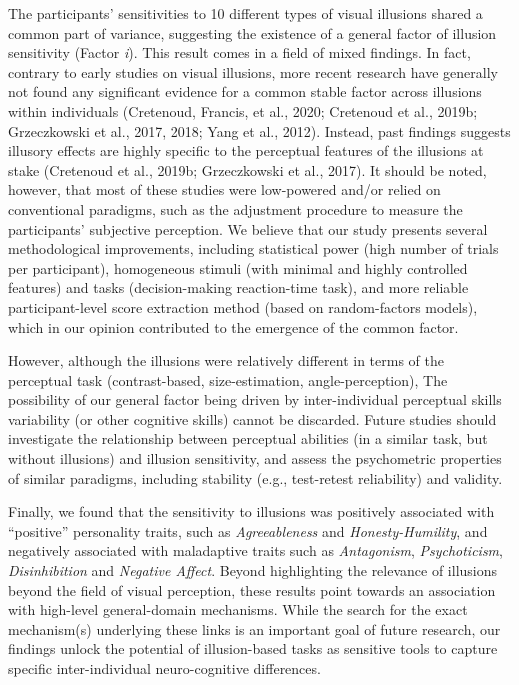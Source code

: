 \documentclass[
  man,floatsintext]{apa6}
\begin{document}
The participants' sensitivities to 10 different types of visual illusions shared a common part of variance, suggesting the existence of a general factor of illusion sensitivity (Factor \emph{i}). This result comes in a field of mixed findings. In fact, contrary to early studies on visual illusions, more recent research have generally not found any significant evidence for a common stable factor across illusions within individuals (Cretenoud, Francis, et al., 2020; Cretenoud et al., 2019b; Grzeczkowski et al., 2017, 2018; Yang et al., 2012). Instead, past findings suggests illusory effects are highly specific to the perceptual features of the illusions at stake (Cretenoud et al., 2019b; Grzeczkowski et al., 2017). It should be noted, however, that most of these studies were low-powered and/or relied on conventional paradigms, such as the adjustment procedure to measure the participants' subjective perception. We believe that our study presents several methodological improvements, including statistical power (high number of trials per participant), homogeneous stimuli (with minimal and highly controlled features) and tasks (decision-making reaction-time task), and more reliable participant-level score extraction method (based on random-factors models), which in our opinion contributed to the emergence of the common factor.

However, although the illusions were relatively different in terms of the perceptual task (contrast-based, size-estimation, angle-perception), The possibility of our general factor being driven by inter-individual perceptual skills variability (or other cognitive skills) cannot be discarded. Future studies should investigate the relationship between perceptual abilities (in a similar task, but without illusions) and illusion sensitivity, and assess the psychometric properties of similar paradigms, including stability (e.g., test-retest reliability) and validity.

Finally, we found that the sensitivity to illusions was positively associated with ``positive'' personality traits, such as \emph{Agreeableness} and \emph{Honesty-Humility}, and negatively associated with maladaptive traits such as \emph{Antagonism}, \emph{Psychoticism}, \emph{Disinhibition} and \emph{Negative Affect}. Beyond highlighting the relevance of illusions beyond the field of visual perception, these results point towards an association with high-level general-domain mechanisms. While the search for the exact mechanism(s) underlying these links is an important goal of future research, our findings unlock the potential of illusion-based tasks as sensitive tools to capture specific inter-individual neuro-cognitive differences.
\end{document}
